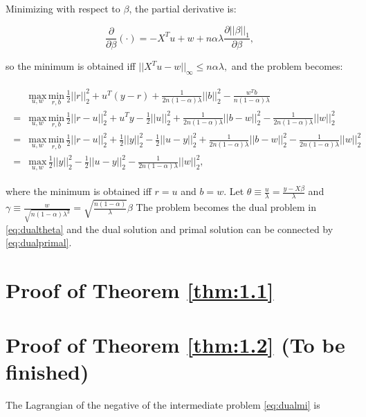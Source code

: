 Minimizing with respect to $\beta$, the partial derivative is:

\begin{equation}
    \label{eq:partialbeta}
    \frac{\partial}{\partial\beta}(\cdot) =-X^Tu+w+n\alpha\lambda\frac{\partial||\beta||_1}{\partial\beta},
\end{equation}

so the minimum is obtained iff $||X^Tu-w||_\infty\leq n\alpha\lambda,$ and the problem becomes:

\begin{gather}
    \label{eq:dualuw}
    \begin{aligned}
        &\underset{u,w}{\mathrm{max}}\,\underset{r,b}{\mathrm{min}}\,\frac{1}{2}||r||_2^2+u^T(y-r)+\frac{1}{2n(1-\alpha)\lambda}||b||_2^2-\frac{w^Tb}{n(1-\alpha)\lambda}\\
        =&\underset{u,w}{\mathrm{max}}\,\underset{r,b}{\mathrm{min}}\,\frac{1}{2}||r-u||_2^2+u^Ty-\frac{1}{2}||u||_2^2+\frac{1}{2n(1-\alpha)\lambda}||b-w||_2^2-\frac{1}{2n(1-\alpha)\lambda}||w||_2^2\\
        =&\underset{u,w}{\mathrm{max}}\,\underset{r,b}{\mathrm{min}}\,\frac{1}{2}||r-u||_2^2+\frac{1}{2}||y||_2^2-\frac{1}{2}||u-y||_2^2+\frac{1}{2n(1-\alpha)\lambda}||b-w||_2^2-\frac{1}{2n(1-\alpha)\lambda}||w||_2^2\\
        =&\underset{u,w}{\mathrm{max}}\,\frac{1}{2}||y||_2^2-\frac{1}{2}||u-y||_2^2-\frac{1}{2n(1-\alpha)\lambda}||w||_2^2,
    \end{aligned}
\end{gather}

where the minimum is obtained iff $r=u$ and $b=w$. Let $\theta\equiv\frac{u}{\lambda}=\frac{y-X\beta}{\lambda}$ and $\gamma\equiv\frac{w}{\sqrt{n(1-\alpha)\lambda^3}}=\sqrt{\frac{n(1-\alpha)}{\lambda}}\beta$ The problem becomes the dual problem in \eqref{eq:dualtheta} and the dual solution and primal solution can be connected by \eqref{eq:dualprimal}.

\section{Proof of Theorem \ref{thm:1.1}}

\section{Proof of Theorem \ref{thm:1.2} (To be finished)}

The Lagrangian of the negative of the intermediate problem \eqref{eq:dualmi} is


